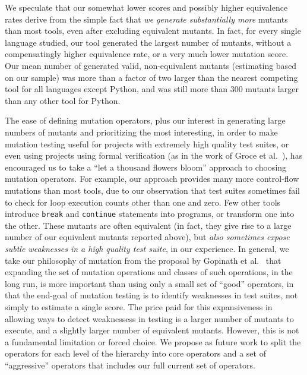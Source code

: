 \documentclass[acmsmall,screen,review,anonymous]{acmart}
\begin{document}
{We speculate that our somewhat lower scores and possibly higher
equivalence rates derive from the simple fact that \emph{we generate
substantially more}
mutants than most tools, even after excluding equivalent mutants.  In fact, for every single language studied,
our tool generated the largest number of mutants, without a
compensatingly higher equivalence rate, or a very much lower
mutation score.  Our mean number of generated valid, non-equivalent
mutants (estimating based on our sample) was more than a factor of
two larger than the nearest competing tool for all languages except
Python, and was still more than 300 mutants larger than any other
tool for Python.

The ease of defining mutation operators,
plus our interest in generating large numbers of mutants and
prioritizing the most interesting, in order to make mutation testing useful for
projects with extremely high quality test suites, or even using
projects using formal
verification (as in the work of Groce et al.~\cite{groce2018verified}), has encouraged us to take a ``let a thousand flowers bloom''
approach to choosing mutation operators.  For example, our approach
provides many more control-flow mutations than most tools, due to our
observation that test suites sometimes fail to check for loop
execution counts other than one and zero.  Few other tools introduce
{\tt break} and {\tt continue} statements into programs, or transform
one into the other.  These mutants are often equivalent (in fact, they
give rise to a large number of our equivalent mutants reported above), but \emph{also
sometimes expose subtle weaknesses in a high quality test suite}, in our
experience.  In general, we take our philosophy of mutation from the
proposal by Gopinath et al.~\cite{Limits,gopinath2017mutation} that
expanding the set of mutation operations and classes of such
operations, in the long run, is more important than using only a small
set of ``good'' operators, in that the end-goal of mutation testing is
to identify weaknesses in test suites, not simply to estimate a single
score.   The price paid for this
expansiveness in allowing ways to detect weaknessess in testing is a
larger number of mutants to execute, and a slightly larger number of
equivalent mutants.  However, this is not a
fundamental limitation or forced choice.  We propose as future work to
split the operators for each level of the hierarchy into
core operators and a set of ``aggressive'' operators
that includes our full current set of operators.

}
\end{document}
